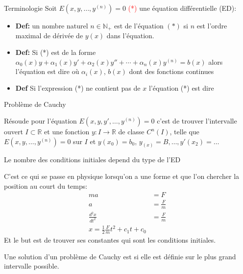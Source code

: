 \documentclass[11pt]{book}
\begin{document}
\begin{parag}{Terminologie}
    Soit $E(x, y, \dots, y^{(n)}) = 0$ \textcolor{red}{(*)} une équation différentielle (ED):
    \begin{itemize}
        \item \textbf{Def:} un nombre naturel $n \in \mathbb{N}_+$ est  de l'équation $(*)$ si $n$ est l'ordre maximal de dérivée de $y(x)$ dans l'équation.
        \item \textbf{Def:} Si (*) est de la forme $\alpha_0(x)y + \alpha_1(x)y' + \alpha_2(x)y'' + \cdots + \alpha_n(x)y^{(n)} = b(x)$ alors l'équation est dire  où $\alpha_i(x)$, $b(x)$ dont des fonctions continues
        \item \textbf{Def} Si l'expression (*) ne contient pas de $x$ l'équation (*) est dire 
    \end{itemize}
\end{parag}
\begin{parag}{Problème de Cauchy}
    \begin{definition}
        Résoude  pour l'équation $E(x, y, y', \dots, y^{(n)}) = 0$ c'est de trouver l'intervalle ouvert $I \subset \mathbb{R}$ et une fonction $y : I \to \mathbb{R}$ de classe $C^n (I)$, telle que $E(x, y, \dots, y^{(n)}) = 0$ sur $I$ et $y(x_0) = b_0$, $y_(x) = B, \dots, y'(x_2) = \dots$
    \end{definition}
    Le nombre des conditions initiales depend du type de l'ED
    \begin{framedremark}
        C'est ce qui se passe en physique lorsqu'on a une forme et que l'on chercher la position au court du temps:
        \begin{align*}
            ma &= F\\
            a &= \frac{F}{m}\\
            \frac{d^2x}{dt^2} &= \frac{F}{m}\\
            x = \frac{1}{2}\frac{F}{m}t^2 + c_1 t + c_0
        \end{align*}
        Et le but est de trouver ses constantes qui sont les conditions initiales.
    \end{framedremark}
    \begin{definition}
        Une solution d'un problème de Cauchy est  si elle est définie sur le plus grand intervalle possible.
    \end{definition}
\end{parag}
\end{document}
